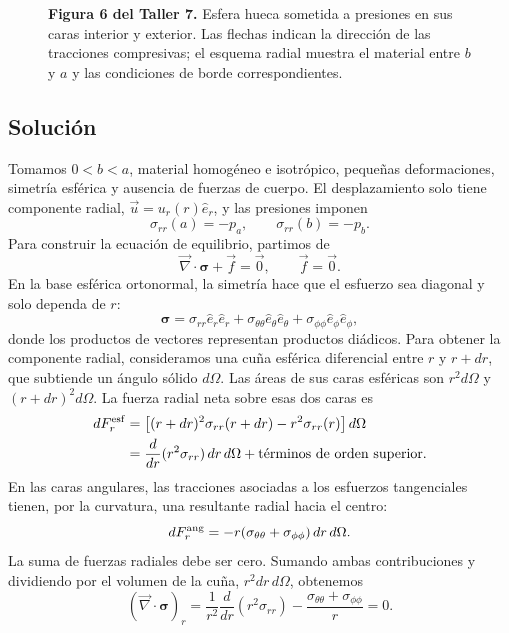 \documentclass[a4paper]{article}
\begin{document}
\begin{figure}[H]
\centering

\par\medskip
\begin{minipage}{\textwidth}
\textbf{Figura 6 del Taller 7.} Esfera hueca sometida a presiones en sus caras interior y exterior. Las flechas indican la dirección de las tracciones compresivas; el esquema radial muestra el material entre $b$ y $a$ y las condiciones de borde correspondientes.
\end{minipage}
\end{figure}

\subsection{Solución}

Tomamos $0<b<a$, material homogéneo e isotrópico, pequeñas deformaciones, simetría esférica y ausencia de fuerzas de cuerpo. El desplazamiento solo tiene componente radial, $\vec u=u_r(r)\hat e_r$, y las presiones imponen
\[
\sigma_{rr}(a)=-p_a,
\qquad
\sigma_{rr}(b)=-p_b.
\]
Para construir la ecuación de equilibrio, partimos de
\[
\vec\nabla\cdot\boldsymbol{\sigma}+\vec f=\vec 0,
\qquad \vec f=\vec 0.
\]
En la base esférica ortonormal, la simetría hace que el esfuerzo sea diagonal y solo dependa de $r$:
\[
\boldsymbol{\sigma}
=\sigma_{rr}\hat e_r\hat e_r
+\sigma_{\theta\theta}\hat e_\theta\hat e_\theta
+\sigma_{\phi\phi}\hat e_\phi\hat e_\phi,
\]
donde los productos de vectores representan productos diádicos. Para obtener la componente radial, consideramos una cuña esférica diferencial entre $r$ y $r+dr$, que subtiende un ángulo sólido $d\Omega$. Las áreas de sus caras esféricas son $r^2d\Omega$ y $(r+dr)^2d\Omega$. La fuerza radial neta sobre esas dos caras es
\[
\begin{aligned}
dF_r^{\rm esf}
&=\left[(r+dr)^2\sigma_{rr}(r+dr)-r^2\sigma_{rr}(r)\right]d\Omega\\
&=\frac{d}{dr}(r^2\sigma_{rr})\,dr\,d\Omega
+\text{términos de orden superior}.
\end{aligned}
\]
En las caras angulares, las tracciones asociadas a los esfuerzos tangenciales tienen, por la curvatura, una resultante radial hacia el centro:
\[
dF_r^{\rm ang}
=-r(\sigma_{\theta\theta}+\sigma_{\phi\phi})\,dr\,d\Omega.
\]
La suma de fuerzas radiales debe ser cero. Sumando ambas contribuciones y dividiendo por el volumen de la cuña, $r^2dr\,d\Omega$, obtenemos
\[
(\vec\nabla\cdot\boldsymbol{\sigma})_r
=\frac{1}{r^2}\frac{d}{dr}(r^2\sigma_{rr})
-\frac{\sigma_{\theta\theta}+\sigma_{\phi\phi}}{r}=0.
\]
\end{document}
